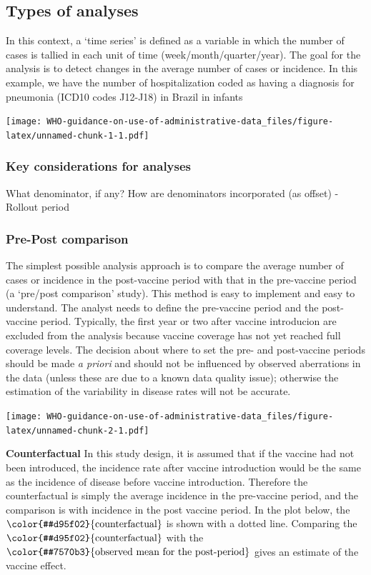 \documentclass[]{article}
\begin{document}
\subsection{Types of analyses}\label{types-of-analyses}

In this context, a `time series' is defined as a variable in which the
number of cases is tallied in each unit of time
(week/month/quarter/year). The goal for the analysis is to detect
changes in the average number of cases or incidence. In this example, we
have the number of hospitalization coded as having a diagnosis for
pneumonia (ICD10 codes J12-J18) in Brazil in infants

\texttt{[image: WHO-guidance-on-use-of-administrative-data\_files/figure-latex/unnamed-chunk-1-1.pdf]}

\subsubsection{Key considerations for
analyses}\label{key-considerations-for-analyses}

What denominator, if any? How are denominators incorporated (as offset)
-Rollout period

\subsubsection{Pre-Post comparison}\label{pre-post-comparison}

The simplest possible analysis approach is to compare the average number
of cases or incidence in the post-vaccine period with that in the
pre-vaccine period (a `pre/post comparison' study). This method is easy
to implement and easy to understand. The analyst needs to define the
pre-vaccine period and the post-vaccine period. Typically, the first
year or two after vaccine introducion are excluded from the analysis
because vaccine coverage has not yet reached full coverage levels. The
decision about where to set the pre- and post-vaccine periods should be
made \emph{a priori} and should not be influenced by observed
aberrations in the data (unless these are due to a known data quality
issue); otherwise the estimation of the variability in disease rates
will not be accurate.

\texttt{[image: WHO-guidance-on-use-of-administrative-data\_files/figure-latex/unnamed-chunk-2-1.pdf]}

\textbf{Counterfactual} In this study design, it is assumed that if the
vaccine had not been introduced, the incidence rate after vaccine
introduction would be the same as the incidence of disease before
vaccine introduction. Therefore the counterfactual is simply the average
incidence in the pre-vaccine period, and the comparison is with
incidence in the post vaccine period. In the plot below, the
\(\color{#d95f02}{\text{counterfactual}}\) is shown with a dotted line.
Comparing the \(\color{#d95f02}{\text{counterfactual}}\) with the
\(\color{#7570b3}{\text{observed mean for the post-period}}\) gives an
estimate of the vaccine effect.
\end{document}
